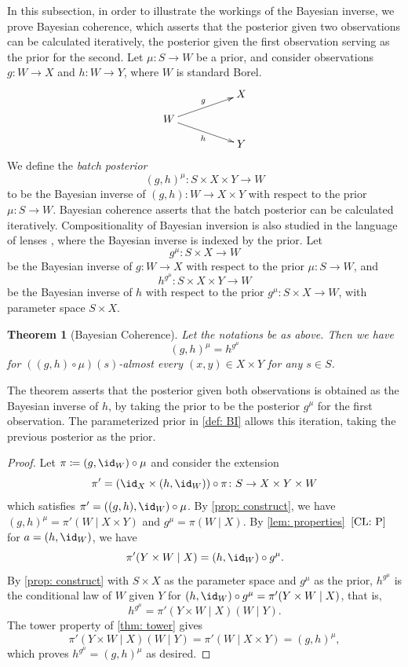 \documentclass[12pt,reqno]{amsart}%
\theoremstyle{plain}
\newtheorem{theorem}{Theorem}[section]
\theoremstyle{definition}
\begin{document}
In this subsection, in order to illustrate the workings of the Bayesian inverse,
we prove Bayesian coherence, which asserts that the posterior given two observations
can be calculated iteratively, the posterior given the first observation serving as the prior for the second.
Let $\mu\colon S\rightarrow W$ be a prior, and consider observations $g\colon W\rightarrow X$ and $h\colon W\rightarrow Y$,
where $W$ is standard Borel.
\[
	\xymatrix@C=50pt@R=10pt{
			&   X  \\
			W  \ar[ur]^g \ar[dr]_h&\\
			&  Y
	}
\]
We define the \emph{batch posterior}
\[
	(g,h)^\mu\colon S\times X\times Y\rightarrow W
\]
to be the Bayesian inverse of $(g,h)\colon W\rightarrow X\times Y$ with respect
to the prior $\mu\colon S\rightarrow W$.
Bayesian coherence asserts that the batch posterior can be calculated iteratively.
Compositionality of Bayesian inversion is also studied in the language of lenses \cite{S20,BHS23},
where the Bayesian inverse is indexed by the prior.
Let
\[
	g^\mu\colon S\times X\rightarrow W
\]
be the Bayesian inverse of $g\colon W\rightarrow X$ with respect to the prior $\mu\colon S\rightarrow W$,
and
\[
	h^{g^\mu}\colon S\times X\times Y\rightarrow W
\]
be the Bayesian inverse of $h$ with respect to the prior $g^\mu\colon S\times X\rightarrow W$,
with parameter space $S\times X$.

\begin{theorem}[Bayesian Coherence]\label{thm: BC}
	Let the notations be as above.  Then we have
	\[
		(g,h)^\mu=h^{g^\mu}
	\]
	for $((g,h)\circ\mu)(s)$-almost every $(x,y)\in X\times Y$ for any $s\in S$.
\end{theorem}

The theorem asserts that the posterior given both observations is obtained
as the Bayesian inverse of $h$, by taking the prior to be the posterior
$g^\mu$ for the first observation.
The parameterized prior in \cref{def: BI} allows this iteration,
taking the previous posterior as the prior.

\begin{proof}
	Let  $\pi\coloneqq (g,\id_W)\circ\mu$ and consider the extension
	\[
		\pi'=(\id_X\times (h,\id_W))\circ\pi \colon S\rightarrow X\times Y\times W
	\]
	which satisfies $\pi'=((g,h),\id_W)\circ\mu$.
	By \cref{prop: construct}, we have
	$(g,h)^\mu=\pi'(W\mid X\times Y)$ and $g^\mu=\pi(W\mid X)$.
	By \cref{lem: properties}~$\ref{CL: P}$ for $a=(h,\id_W)$, we have
	\[
		\pi'(Y\times W\mid X)=(h,\id_W)\circ g^\mu.
	\]
	By \cref{prop: construct} with $S\times X$ as the parameter space and $g^\mu$ as the prior,
	$h^{g^\mu}$ is the conditional law of $W$ given $Y$ for $(h,\id_W)\circ g^\mu=\pi'(Y\times W\mid X)$, that is,
	\[
		h^{g^\mu}=\pi'(Y\times W\mid X)(W\mid Y).
	\]
	The tower property of \cref{thm: tower} gives
	\[
		\pi'(Y\times W\mid X)(W\mid Y)=\pi'(W\mid X\times Y)=(g,h)^\mu,
	\]
	which proves $h^{g^\mu}=(g,h)^\mu$ as desired.
\end{proof}
\end{document}
